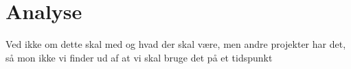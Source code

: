\chapter{Analyse}

Ved ikke om dette skal med og hvad der skal være, men andre projekter har det, så mon ikke vi finder ud af at vi skal bruge det på et tidspunkt